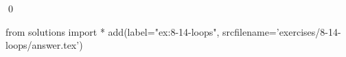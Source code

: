 
\begin{ex}
  \label{ex:8-14-loops}
  
  \qed
\end{ex}
\begin{python0}
from solutions import *
add(label="ex:8-14-loops",
    srcfilename='exercises/8-14-loops/answer.tex')
\end{python0}
